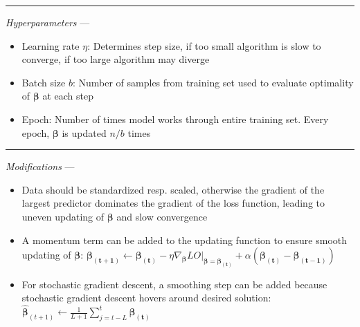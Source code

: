{\color{lightgray}\hrule height 0.001mm}

\emph{Hyperparameters} ---
\begin{itemize}
    \item Learning rate $\eta$: Determines step size, if too small algorithm is slow to converge, if too large algorithm may diverge
    \item Batch size $b$: Number of samples from training set used to evaluate optimality of $\boldsymbol{\beta}$ at each step
    \item Epoch: Number of times model works through entire training set. Every epoch, $\boldsymbol{\beta}$ is updated $n/b$ times
\end{itemize}

{\color{lightgray}\hrule height 0.001mm}

\emph{Modifications} ---
\begin{itemize}
    \item Data should be standardized resp. scaled, otherwise the gradient of the largest predictor dominates the gradient of the loss function, leading to uneven updating of $\boldsymbol{\beta}$ and slow convergence
    \item A momentum term can be added to the updating function to ensure smooth updating of $\boldsymbol{\beta}$: $\boldsymbol{\beta_{(t+1)}} \leftarrow \boldsymbol{\beta_{(t)}} - \eta \nabla_{\boldsymbol{\beta}} LO |_{\boldsymbol{\beta} = \boldsymbol{\beta_{(t)}}} + \alpha(\boldsymbol{\beta_{(t)}} - \boldsymbol{\beta_{(t-1)}})$
    \item For stochastic gradient descent, a smoothing step can be added because stochastic gradient descent hovers around desired solution: $\hat{\boldsymbol{\beta}}_{(t+1)} \leftarrow \frac{1}{L+1} \sum_{j=t-L}^t \boldsymbol{\beta_{(t)}}$
\end{itemize}